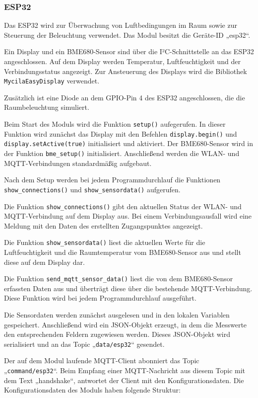 \documentclass[12pt, letterpaper]{article}
\begin{document}
\subsubsection{ESP32}
\par Das ESP32 wird zur Überwachung von Luftbedingungen im Raum sowie zur Steuerung der Beleuchtung verwendet. Das Modul besitzt die Geräte-ID „esp32“. 
\par Ein Display \cite{docdisplay} und ein BME680-Sensor sind über die I²C-Schnittstelle an das ESP32 angeschlossen. Auf dem Display werden Temperatur, Luftfeuchtigkeit und der Verbindungsstatus angezeigt. Zur Ansteuerung des Displays wird die Bibliothek \texttt{MycilaEasyDisplay} \cite{easdisplay} verwendet. 
\par Zusätzlich ist eine Diode an dem GPIO-Pin 4 des ESP32 angeschlossen, die die Raumbeleuchtung simuliert.
\par Beim Start des Moduls wird die Funktion \texttt{setup()} aufegerufen. In dieser Funktion wird zunächst das Display mit den Befehlen \texttt{display.begin()} und \texttt{display.setActive(true)} initialisiert und aktiviert. Der BME680-Sensor wird in der Funktion \texttt{bme\_setup()} initialisiert. Anschließend werden die WLAN- und MQTT-Verbindungen standardmäßig aufgebaut. 
\par Nach dem Setup werden bei jedem Programmdurchlauf die Funktionen \texttt{show\_connections()} und \texttt{show\_sensordata()} aufgerufen. 
\par Die Funktion \texttt{show\_connections()} gibt den aktuellen Status der WLAN- und MQTT-Verbindung auf dem Display aus. Bei einem Verbindungsausfall wird eine Meldung mit den Daten des erstellten Zugangspunktes angezeigt.
\par Die Funktion \texttt{show\_sensordata()} liest die aktuellen Werte für die Luftfeuchtigkeit und die Raumtemperatur vom BME680-Sensor aus und stellt diese auf dem Display dar.
\par Die Funktion \texttt{send\_mqtt\_sensor\_data()} liest die von dem BME680-Sensor erfassten Daten aus und überträgt diese über die bestehende MQTT-Verbindung. Diese Funktion wird bei jedem Programmdurchlauf ausgeführt.
\par Die Sensordaten werden zunächst ausgelesen und in den lokalen Variablen gespeichert. Anschließend wird ein JSON-Objekt erzeugt, in dem die Messwerte den entsprechenden Feldern zugewiesen werden. Dieses JSON-Objekt wird serialisiert und an das Topic „\texttt{data/esp32}“ gesendet. 
\par Der auf dem Modul laufende MQTT-Client abonniert das Topic „\texttt{command/esp32}“. Beim Empfang einer MQTT-Nachricht aus diesem Topic mit dem Text „handshake“, antwortet der Client mit den Konfigurationsdaten. Die Konfigurationsdaten des Moduls haben folgende Struktur:
\end{document}

